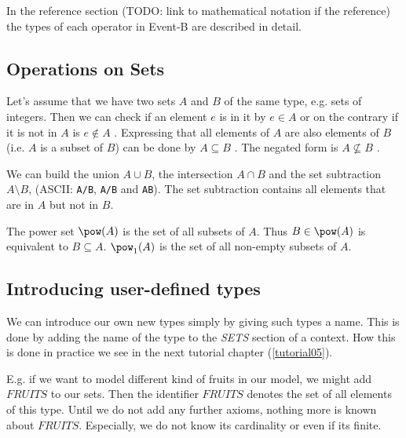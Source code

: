 
In the reference section (TODO: link to mathematical notation if the reference) the types of each operator in Event-B are described in detail.

\subsection{Operations on Sets}
\label{tut:operations_on_sets}
Let's assume that we have two sets $A$ and $B$ of the same type, e.g. sets of integers.
Then we can check if an element $e$ is in it by $e\in A$  or 
on the contrary if it is not in $A$ is $e\notin A$ .
Expressing that all elements of $A$ are also elements of $B$ (i.e. $A$ is a subset of $B$) can
be done by $A\subseteq B$ . The negated form is $A\not\subseteq B$ .

We can build the union $A\cup B$, the intersection $A\cap B$ and the set subtraction $A\setminus B$,
(ASCII: \texttt{A\mybackslash{}/B}, \texttt{A/\mybackslash{}B} and \texttt{A\mybackslash{}B}). The
set subtraction contains all elements that are in $A$ but not in $B$.

The power set $\pow(A)$  is the set of all subsets of $A$.
Thus $B\in\pow(A)$ is equivalent to $B\subseteq A$.
$\pow_1(A)$  is the set of all non-empty subsets of $A$.

\subsection{Introducing user-defined types}
\label{tut:user_defined_sets}

We can introduce our own new types simply by giving such types a name.
This is done by adding the name of the type to the \textsl{SETS} section of a context.
How this is done in practice we see in the next tutorial chapter (\ref{tutorial05}).

E.g. if we want to model different kind of fruits in our model, we might add $FRUITS$ to our
sets. Then the identifier $FRUITS$ denotes the set of all elements of this type. Until we
do not add any further axioms, nothing more is known about $FRUITS$.  Especially, we do not
know its cardinality or even if its finite.

